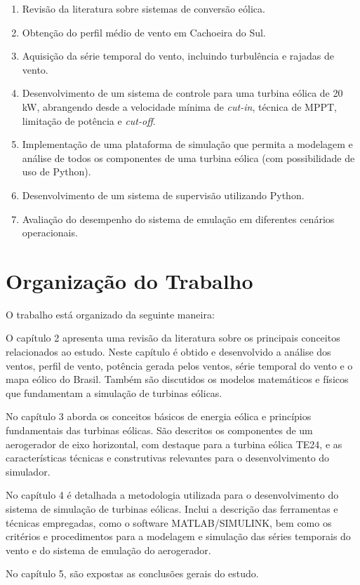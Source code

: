 \begin{enumerate}
    \item Revisão da literatura sobre sistemas de conversão eólica.

    \item Obtenção do perfil médio de vento em Cachoeira do Sul.
    
    \item Aquisição da série temporal do vento, incluindo turbulência e rajadas de vento.

    \item Desenvolvimento de um sistema de controle para uma turbina eólica de 20 kW, abrangendo desde a velocidade mínima de \textit{cut-in}, técnica de MPPT, limitação de potência e \textit{cut-off}.

    \item Implementação de uma plataforma de simulação que permita a modelagem e análise de todos os componentes de uma turbina eólica (com possibilidade de uso de Python).

    \item Desenvolvimento de um sistema de supervisão utilizando Python.

    \item Avaliação do desempenho do sistema de emulação em diferentes cenários operacionais.
    
\end{enumerate}

\section{Organização do Trabalho}
\par O trabalho está organizado da seguinte maneira:
\par O capítulo 2 apresenta uma revisão da literatura sobre os principais conceitos relacionados ao estudo. Neste capítulo é obtido e desenvolvido a análise dos ventos, perfil de vento, potência gerada pelos ventos, série temporal do vento e o mapa eólico do Brasil. Também são discutidos os modelos matemáticos e físicos que fundamentam a simulação de turbinas eólicas.
\par No capítulo 3 aborda os conceitos básicos de energia eólica e princípios fundamentais das turbinas eólicas. São descritos os componentes de um aerogerador de eixo horizontal, com destaque para a turbina eólica TE24, e as características técnicas e construtivas relevantes para o desenvolvimento do simulador.
\par No capítulo 4 é detalhada a metodologia utilizada para o desenvolvimento do sistema de simulação de turbinas eólicas. Inclui a descrição das ferramentas e técnicas empregadas, como o software MATLAB/SIMULINK, bem como os critérios e procedimentos para a modelagem e simulação das séries temporais do vento e do sistema de emulação do aerogerador.
\par No capítulo 5, são expostas as conclusões gerais do estudo.

